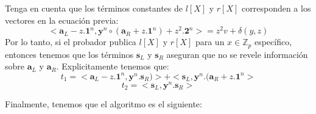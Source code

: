 Tenga en cuenta que los términos constantes de $l[X]$ y $r[X]$ corresponden a los vectores en la ecuación previa:
$$<\mathbf{a}_{L} - z.\mathbf{1}^{n}, \mathbf{y}^{n} \circ (\mathbf{a}_{R} + z.\mathbf{1}^{n}) + z^{2}.\mathbf{2}^{n}> = z^{2}v + \delta(y, z)$$
Por lo tanto, si el probador publica $l[X]$ y $r[X]$ para un $x \in \mathbb{Z}_{p}$ específico, entonces tenemos que los términos $\mathbf{s}_{L}$ y $\mathbf{s}_{R}$ aseguran que no se revele información sobre $\mathbf{a}_{L}$ y $\mathbf{a}_{R}$.
Explicitamente tenemos que:
$$t_{1} = <\mathbf{a}_{L} - z.\mathbf{1}^{n}, \mathbf{y}^{n}.\mathbf{s}_{R})> + <\mathbf{s}_{L}, \mathbf{y}^{n}.(\mathbf{a}_{R} + z.\mathbf{1}^{n}>$$
$$t_{2} = <\mathbf{s}_{L}, \mathbf{y}^{n}.\mathbf{s}_{R}>$$

Finalmente, tenemos que el algoritmo es el siguiente:

